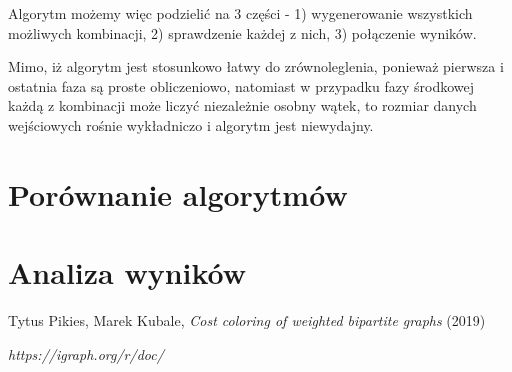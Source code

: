 \documentclass{article}
\begin{document}
Algorytm możemy więc podzielić na 3 części - 1) wygenerowanie wszystkich możliwych kombinacji, 2) sprawdzenie każdej z nich, 3) połączenie wyników.

Mimo, iż algorytm jest stosunkowo łatwy do zrównoleglenia, ponieważ pierwsza i ostatnia faza są proste obliczeniowo, natomiast w przypadku fazy środkowej każdą z kombinacji może liczyć niezależnie osobny wątek, to rozmiar danych wejściowych rośnie wykładniczo i algorytm jest niewydajny. 

\section{Porównanie algorytmów}

\section{Analiza wyników}

\begin{thebibliography}{9}

Tytus Pikies, Marek Kubale,
\emph{Cost coloring of weighted bipartite graphs}
(2019)

\emph{https://igraph.org/r/doc/}

\end{thebibliography}
\end{document}
